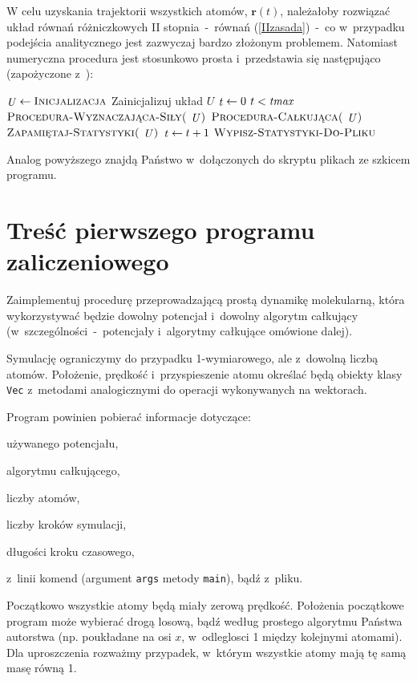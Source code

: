 \documentclass[a4paper,11pt,twoside]{book}
\newenvironment{packed_enum}{
\begin{enumerate}
  \setlength{\itemsep}{1pt}
  \setlength{\parskip}{0pt}
  \setlength{\parsep}{0pt}
}{\end{enumerate}}
\begin{document}
W celu uzyskania trajektorii wszystkich atomów, $\mathbf{r}(t)$, należałoby rozwiązać układ równań różniczkowych II stopnia~-~równań (\ref{IIzasada})~-~co w~przypadku podejścia analitycznego jest zazwyczaj bardzo złożonym problemem. Natomiast numeryczna procedura jest stosunkowo prosta i~przedstawia się następująco (zapożyczone z~\cite{understanding}):
\begin{codebox}
	\li $\id{U}\gets\proc{Inicjalizacja}$ 
	\li \Comment Zainicjalizuj układ $U$
	\li $\id{t} \gets 0$
	\li \While $t < \id{tmax}$
	\li \Do
		\li $\proc{Procedura-Wyznaczająca-Siły(\id{U})}$
		\li $\proc{Procedura-Całkująca(\id{U})}$
		\li $\proc{Zapamiętaj-Statystyki(\id{U})}$
		\li $\id{t}\gets t+1$
	\End
	\li $\textnormal{\scshape Wypisz-Statystyki-Do-Pliku}$
\End
\end{codebox}
Analog powyższego znajdą Państwo w~dołączonych do skryptu plikach ze szkicem programu.
\section{Treść pierwszego programu zaliczeniowego}
Zaimplementuj procedurę przeprowadzającą prostą dynamikę molekularną, która wykorzystywać będzie dowolny potencjał i~dowolny algorytm całkujący (w~szczególności~-~potencjały i~algorytmy całkujące omówione dalej).

Symulację ograniczymy do przypadku 1-wymiarowego, ale z~dowolną liczbą atomów. Położenie, prędkość i~przyspieszenie atomu określać będą obiekty klasy \texttt{Vec} z~metodami analogicznymi do operacji wykonywanych na wektorach.

Program powinien pobierać informacje dotyczące:
\begin{packed_enum}
\item używanego potencjału,
\item algorytmu całkującego, 
\item liczby atomów,
\item liczby kroków symulacji,
\item długości kroku czasowego,
\end{packed_enum}
z~linii komend (argument \texttt{args} metody \texttt{main}), bądź z~pliku.

Początkowo wszystkie atomy będą miały zerową prędkość. Położenia początkowe program może wybierać drogą losową, bądź według prostego algorytmu Państwa autorstwa (np. poukładane na osi $x$, w~odleglosci 1 między kolejnymi atomami). Dla uproszczenia rozważmy przypadek, w~którym wszystkie atomy mają tę samą masę równą 1.
\end{document}
